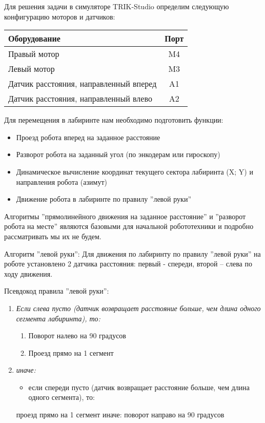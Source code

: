 \solutionSection

Для решения задачи в симуляторе TRIK-Studio определим следующую конфигурацию моторов и датчиков:

\begin{center}
	\begin{tabular}{|l|c|}
		\hline 
		\rule{0pt}{2.5ex} \textbf{Оборудование} & \textbf{Порт} \\ 
		\hline 
		\rule{0pt}{2.5ex} Правый мотор & M4 \\ 
		\hline 
		\rule{0pt}{2.5ex} Левый мотор & M3 \\ 
		\hline 
		\rule{0pt}{2.5ex} Датчик расстояния, направленный вперед & A1 \\ 
		\hline 
		\rule{0pt}{2.5ex} Датчик расстояния, направленный влево & A2 \\ 
		\hline 
	\end{tabular} 
\end{center}

Для перемещения в лабиринте нам необходимо подготовить функции:
\begin{itemize}
	\item Проезд робота вперед на заданное расстояние
	\item Разворот робота на заданный угол (по энкодерам или гироскопу)
	\item Динамическое вычисление координат текущего сектора лабиринта (X; Y) и направления робота (азимут)
	\item Движение робота в лабиринте по правилу ''левой руки''
\end{itemize}


Алгоритмы ''прямолинейного движения на заданное расстояние'' и ''разворот робота на месте'' являются базовыми для начальной робототехники и подробно рассматривать мы их не будем.

Алгоритм ''левой руки'':
Для движения по лабиринту по правилу ''левой руки'' на роботе установлено 2 датчика расстояния: первый - спереди, второй – слева по ходу движения.

Псевдокод правила ''левой руки'':
\begin{enumerate}
	\item \textit{Если слева пусто (датчик возвращает расстояние больше, чем длина одного сегмента лабиринта), то:}
	\begin{enumerate}
		\item Поворот налево на 90 градусов
		\item Проезд прямо на 1 сегмент
	\end{enumerate}	
	\item \textit{иначе:}
	\begin{itemize}
		\item если спереди пусто (датчик возвращает расстояние больше, чем длина одного сегмента), то:
	\end{itemize}
	проезд прямо на 1 сегмент
	иначе:
	поворот направо на 90 градусов
\end{enumerate}


